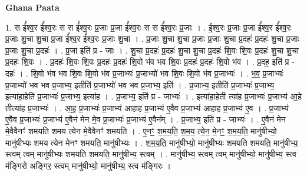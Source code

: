 \documentclass[17pt]{extarticle}
\begin{document}
\textbf{Ghana Paata } \newline

1. स ई᳚श्व॒र ई᳚श्व॒रः स स ई᳚श्व॒रः प्र॒जाः प्र॒जा ई᳚श्व॒रः स स ई᳚श्व॒रः प्र॒जाः । . ई॒श्व॒रः प्र॒जाः प्र॒जा ई᳚श्व॒र ई᳚श्व॒रः प्र॒जाः शु॒चा शु॒चा प्र॒जा ई᳚श्व॒र ई᳚श्व॒रः प्र॒जाः शु॒चा । . प्र॒जाः शु॒चा शु॒चा प्र॒जाः प्र॒जाः शु॒चा प्र॒दहः॑ प्र॒दहः॑ शु॒चा प्र॒जाः प्र॒जाः शु॒चा प्र॒दहः॑ । . प्र॒जा इति॑ प्र - जाः । . शु॒चा प्र॒दहः॑ प्र॒दहः॑ शु॒चा शु॒चा प्र॒दहः॑ शि॒वः शि॒वः प्र॒दहः॑ शु॒चा शु॒चा प्र॒दहः॑ शि॒वः । . प्र॒दहः॑ शि॒वः शि॒वः प्र॒दहः॑ प्र॒दहः॑ शि॒वो भ॑व भव शि॒वः प्र॒दहः॑ प्र॒दहः॑ शि॒वो भ॑व । . प्र॒दह॒ इति॑ प्र - दहः॑ । . शि॒वो भ॑व भव शि॒वः शि॒वो भ॑व प्र॒जाभ्यः॑ प्र॒जाभ्यो॑ भव शि॒वः शि॒वो भ॑व प्र॒जाभ्यः॑ । . भ॒व॒ प्र॒जाभ्यः॑ प्र॒जाभ्यो॑ भव भव प्र॒जाभ्य॒ इतीति॑ प्र॒जाभ्यो॑ भव भव प्र॒जाभ्य॒ इति॑ । . प्र॒जाभ्य॒ इतीति॑ प्र॒जाभ्यः॑ प्र॒जाभ्य॒ इत्या॑हा॒हेति॑ प्र॒जाभ्यः॑ प्र॒जाभ्य॒ इत्या॑ह । . प्र॒जाभ्य॒ इति॑ प्र - जाभ्यः॑ । . इत्या॑हा॒हेती त्या॑ह प्र॒जाभ्यः॑ प्र॒जाभ्य॑ आ॒हे तीत्या॑ह प्र॒जाभ्यः॑ । . आ॒ह॒ प्र॒जाभ्यः॑ प्र॒जाभ्य॑ आहाह प्र॒जाभ्य॑ ए॒वैव प्र॒जाभ्य॑ आहाह प्र॒जाभ्य॑ ए॒व । . प्र॒जाभ्य॑ ए॒वैव प्र॒जाभ्यः॑ प्र॒जाभ्य॑ ए॒वैन॑ मेन मे॒व प्र॒जाभ्यः॑ प्र॒जाभ्य॑ ए॒वैन᳚म् । . प्र॒जाभ्य॒ इति॑ प्र - जाभ्यः॑ । . ए॒वैन॑ मेन मे॒वैवैनꣳ॑ शमयति शमय त्येन मे॒वैवैनꣳ॑ शमयति । . ए॒नꣳ॒॒ श॒म॒य॒ति॒ श॒म॒य॒ त्ये॒न॒ मे॒नꣳ॒॒ श॒म॒य॒ति॒ मानु॑षीभ्यो॒ मानु॑षीभ्यः शमय त्येन मेनꣳ शमयति॒ मानु॑षीभ्यः । . श॒म॒य॒ति॒ मानु॑षीभ्यो॒ मानु॑षीभ्यः शमयति शमयति॒ मानु॑षीभ्य॒ स्त्वम् त्वम् मानु॑षीभ्यः शमयति शमयति॒ मानु॑षीभ्य॒ स्त्वम् । . मानु॑षीभ्य॒ स्त्वम् त्वम् मानु॑षीभ्यो॒ मानु॑षीभ्य॒ स्त्व म॑ङ्गिरो अङ्गिर॒ स्त्वम् मानु॑षीभ्यो॒ मानु॑षीभ्य॒ स्त्व म॑ङ्गिरः । \newline
\end{document}
